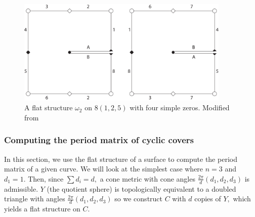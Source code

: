 \documentclass[12pt,reqno]{amsart}
\theoremstyle{definition}
\theoremstyle{remark}
\newtheorem*{remark}{Remark}
\begin{document}
\begin{figure}[htbp]
   \centering
   \includegraphics[width=4in]{figures/flat_rs2.pdf} 
  \caption{A flat structure $\omega_2$ on $8(1, 2, 5)$ with four simple zeros. Modified from \cite{dthesis}}
  \label{fig:flat_rs2}
\end{figure}




\subsubsection*{Computing the period matrix of cyclic covers}
\label{sec:cyclicperiod}
In this section, we use the flat structure of a surface to compute the period matrix of a given curve. We will look at the simplest case where $n = 3$ and $d_1 = 1.$ Then, since $\sum d_i = d,$ a cone metric with cone angles $\frac{2 \pi}{d}(d_1, d_2, d_3)$ is admissible. $Y$ (the quotient sphere) is topologically equivalent to a doubled triangle with angles $\frac{2 \pi}{d}(d_1, d_2, d_3)$ so we construct $C$ with $d$ copies of $Y,$ which yields a flat structure on $C.$ 
\end{document}
